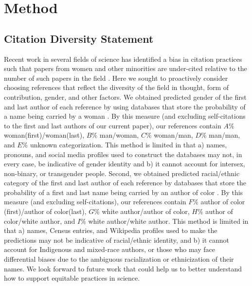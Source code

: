 \documentclass[12pt]{article}
\begin{document}
\section{Method}
\subsection{Citation Diversity Statement}

Recent work in several fields of science has identified a bias in citation practices such that papers from women and other minorities are under-cited relative to the number of such papers in the field \cite{mitchell2013gendered,dion2018gendered,caplar2017quantitative, maliniak2013gender, Dworkin2020.01.03.894378}. Here we sought to proactively consider choosing references that reflect the diversity of the field in thought, form of contribution, gender, and other factors. We obtained predicted gender of the first and last author of each reference by using databases that store the probability of a name being carried by a woman \cite{Dworkin2020.01.03.894378,zhou_dale_2020_3672110}. By this measure (and excluding self-citations to the first and last authors of our current paper), our references contain $A\%$ woman(first)/woman(last), $B\%$ man/woman, $C\%$ woman/man, $D\%$ man/man, and $E\%$ unknown categorization. This method is limited in that a) names, pronouns, and social media profiles used to construct the databases may not, in every case, be indicative of gender identity and b) it cannot account for intersex, non-binary, or transgender people. Second, we obtained predicted racial/ethnic category of the first and last author of each reference by databases that store the probability of a first and last name being carried by an author of color \cite{ambekar2009name, sood2018predicting}. By this measure (and excluding self-citations), our references contain $F\%$ author of color (first)/author of color(last), $G\%$ white author/author of color, $H\%$ author of color/white author, and $I\%$ white author/white author. This method is limited in that a) names, Census entries, and Wikipedia profiles used to make the predictions may not be indicative of racial/ethnic identity, and b) it cannot account for Indigenous and mixed-race authors, or those who may face differential biases due to the ambiguous racialization or ethnicization of their names. We look forward to future work that could help us to better understand how to support equitable practices in science.

\newpage


\end{document}
